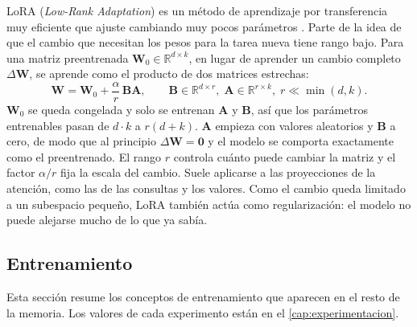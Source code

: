 
LoRA (\textit{Low-Rank Adaptation}) es un método de aprendizaje por transferencia muy eficiente que ajuste cambiando muy pocos parámetros \cite{hu2022lora}. Parte de la idea de que el cambio que necesitan los pesos para la tarea nueva tiene rango bajo. Para una matriz preentrenada $\mathbf{W}_0 \in \mathbb{R}^{d \times k}$, en lugar de aprender un cambio completo $\Delta\mathbf{W}$, se aprende como el producto de dos matrices estrechas:
\begin{equation}
  \mathbf{W} = \mathbf{W}_0 + \frac{\alpha}{r}\,\mathbf{B}\mathbf{A}, \qquad \mathbf{B} \in \mathbb{R}^{d \times r},\; \mathbf{A} \in \mathbb{R}^{r \times k},\; r \ll \min(d,k).
  \label{eq:lora}
\end{equation}
$\mathbf{W}_0$ se queda congelada y solo se entrenan $\mathbf{A}$ y $\mathbf{B}$, así que los parámetros entrenables pasan de $d \cdot k$ a $r(d+k)$. $\mathbf{A}$ empieza con valores aleatorios y $\mathbf{B}$ a cero, de modo que al principio $\Delta\mathbf{W} = \mathbf{0}$ y el modelo se comporta exactamente como el preentrenado. El rango $r$ controla cuánto puede cambiar la matriz y el factor $\alpha/r$ fija la escala del cambio. Suele aplicarse a las proyecciones de la atención, como las de las consultas y los valores. Como el cambio queda limitado a un subespacio pequeño, LoRA también actúa como regularización: el modelo no puede alejarse mucho de lo que ya sabía.

\subsection{Entrenamiento}
\label{sec:entrenamiento-teoria}

Esta sección resume los conceptos de entrenamiento que aparecen en el resto de la memoria. Los valores de cada experimento están en el \cref{cap:experimentacion}.

